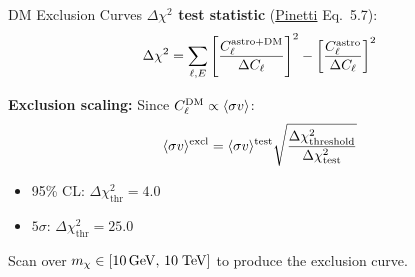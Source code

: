 \begin{frame}{DM Exclusion Curves}
\textbf{$\Delta\chi^2$ test statistic} (\href{https://arxiv.org/abs/1911.04989}{Pinetti} Eq.~5.7):
\begin{equation}
\Delta\chi^2 = \sum_{\ell,E}\left[\frac{C_\ell^{\mathrm{astro+DM}}}{\Delta C_\ell}\right]^2 - \left[\frac{C_\ell^{\mathrm{astro}}}{\Delta C_\ell}\right]^2
\end{equation}

\textbf{Exclusion scaling:} Since $C_\ell^{\mathrm{DM}} \propto \langle\sigma v\rangle$:
\begin{equation}
\langle\sigma v\rangle^{\mathrm{excl}} = \langle\sigma v\rangle^{\mathrm{test}}\sqrt{\frac{\Delta\chi^2_{\mathrm{threshold}}}{\Delta\chi^2_{\mathrm{test}}}}
\end{equation}

\begin{itemize}
    \item 95\% CL: $\Delta\chi^2_{\mathrm{thr}} = 4.0$
    \item $5\sigma$: $\Delta\chi^2_{\mathrm{thr}} = 25.0$
\end{itemize}

Scan over $m_\chi \in [10\,\mathrm{GeV},\, 10\;\mathrm{TeV}]$ to produce the exclusion curve.
\end{frame}
